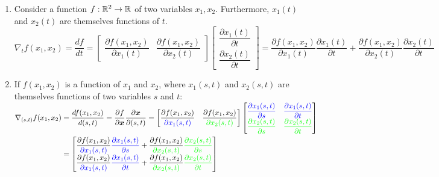 \begin{enumerate}
    \item Consider a function $f : \mathbb{R}^2 \to \mathbb{R}$ of two variables $x_1, x_2$.
    Furthermore, $x_1(t)$ and $x_2(t)$ are themselves functions of $t$.
    \\
    $
        \nabla_t f(x_1, x_2)
        = \dfrac{df}{dt}
        = \begin{bmatrix}
            \dfrac{\partial f(x_1, x_2)}{\partial x_1(t)} &
            \dfrac{\partial f(x_1, x_2)}{\partial x_2(t)}
        \end{bmatrix}
        \begin{bmatrix}
            \dfrac{\partial x_1(t)}{\partial t} \\
            \dfrac{\partial x_2(t)}{\partial t}
        \end{bmatrix}
        = \dfrac{\partial f(x_1, x_2)}{\partial x_1(t)} \dfrac{\partial x_1(t)}{\partial t}
        + \dfrac{\partial f(x_1, x_2)}{\partial x_2(t)} \dfrac{\partial x_2(t)}{\partial t}
    $
    \hfill \cite{mfml/book/mml/Deisenroth-Faisal-Ong}

    \item If $f (x_1, x_2)$ is a function of $x_1$ and $x_2$, where $x_1(s, t)$ and $x_2(s, t)$ are themselves functions of two variables $s$ and $t$:
    \\
    $
        \begin{aligned}
        \nabla_{(s,t)} f(x_1, x_2)
        &= \dfrac{df(x_1, x_2)}{d(s,t)}
        = \dfrac{\partial f}{\partial \bm{x}} \dfrac{\partial \bm{x}}{\partial (s,t)}
        = \begin{bmatrix}
            \dfrac{\partial f(x_1, x_2)}{\textcolor{blue}{\partial x_1(s,t)}} &
            \dfrac{\partial f(x_1, x_2)}{\textcolor{green}{\partial x_2(s,t)}}
        \end{bmatrix}
        \begin{bmatrix}
            \textcolor{blue}{\dfrac{\partial x_1(s,t)}{\partial s}} & \textcolor{blue}{\dfrac{\partial x_1(s,t)}{\partial t}} \\
            \textcolor{green}{\dfrac{\partial x_2(s,t)}{\partial s}} & \textcolor{green}{\dfrac{\partial x_2(s,t)}{\partial t}}
        \end{bmatrix}
        \\
        &=
        \begin{bmatrix}
            \dfrac{\partial f(x_1, x_2)}{\textcolor{blue}{\partial x_1(s,t)}}
            \textcolor{blue}{\dfrac{\partial x_1(s,t)}{\partial s}} +
            \dfrac{\partial f(x_1, x_2)}{\textcolor{green}{\partial x_2(s,t)}}
            \textcolor{green}{\dfrac{\partial x_2(s,t)}{\partial s}} \\
            \dfrac{\partial f(x_1, x_2)}{\textcolor{blue}{\partial x_1(s,t)}}
            \textcolor{blue}{\dfrac{\partial x_1(s,t)}{\partial t}} +
            \dfrac{\partial f(x_1, x_2)}{\textcolor{green}{\partial x_2(s,t)}}
            \textcolor{green}{\dfrac{\partial x_2(s,t)}{\partial t}}
        \end{bmatrix}
        \end{aligned}
    $
    \hfill \cite{mfml/book/mml/Deisenroth-Faisal-Ong}


\end{enumerate}
